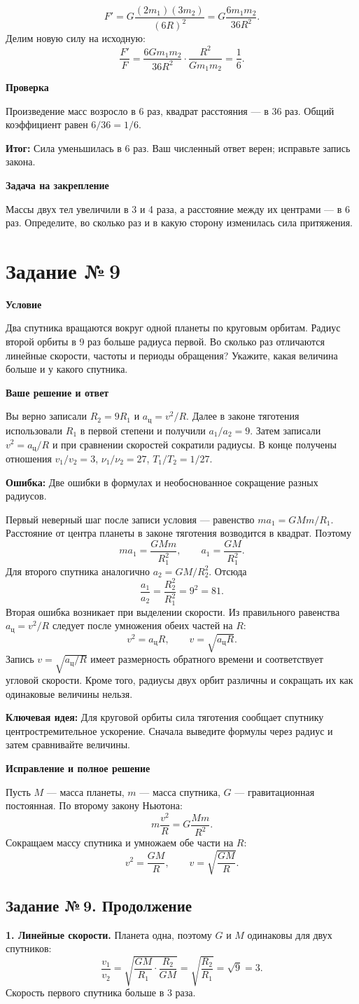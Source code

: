 \documentclass[a4paper,12pt]{article}
\newcommand{\topic}[1]{\par\medskip\textbf{\textcolor{darkaccent}{#1}}\par}
\newcommand{\error}[1]{\par\medskip\textbf{\textcolor{err}{Ошибка:}} #1\par}
\newcommand{\key}[1]{\par\medskip\textbf{\textcolor{blue!60!black}{Ключевая идея:}} #1\par}
\newcommand{\result}[1]{\par\medskip\textbf{\textcolor{accent}{Итог:}} #1\par}
\newcommand{\task}[1]{\clearpage\phantomsection\label{task:#1}\section*{Задание №\,#1}}
\begin{document}
\[ F'=G\frac{(2m_1)(3m_2)}{(6R)^2}=G\frac{6m_1m_2}{36R^2}. \]
Делим новую силу на исходную:
\[ \frac{F'}{F}=\frac{6Gm_1m_2}{36R^2}\cdot\frac{R^2}{Gm_1m_2}=\frac16. \]
\topic{Проверка}
Произведение масс возросло в 6 раз, квадрат расстояния --- в 36 раз. Общий коэффициент равен $6/36=1/6$.
\result{Сила уменьшилась в 6 раз. Ваш численный ответ верен; исправьте запись закона.}
\topic{Задача на закрепление}
Массы двух тел увеличили в 3 и 4 раза, а расстояние между их центрами --- в 6 раз. Определите, во сколько раз и в какую сторону изменилась сила притяжения.
\task{9}
\topic{Условие}
Два спутника вращаются вокруг одной планеты по круговым орбитам. Радиус второй орбиты в 9 раз больше радиуса первой. Во сколько раз отличаются линейные скорости, частоты и периоды обращения? Укажите, какая величина больше и у какого спутника.
\topic{Ваше решение и ответ}
Вы верно записали $R_2=9R_1$ и $a_{\text{ц}}=v^2/R$. Далее в законе тяготения использовали $R_1$ в первой степени и получили $a_1/a_2=9$. Затем записали $v^2=a_{\text{ц}}/R$ и при сравнении скоростей сократили радиусы. В конце получены отношения $v_1/v_2=3$, $\nu_1/\nu_2=27$, $T_1/T_2=1/27$.
\error{Две ошибки в формулах и необоснованное сокращение разных радиусов.}
Первый неверный шаг после записи условия --- равенство $ma_1=GMm/R_1$. Расстояние от центра планеты в законе тяготения возводится в квадрат. Поэтому
\[ ma_1=\frac{GMm}{R_1^2},\qquad a_1=\frac{GM}{R_1^2}. \]
Для второго спутника аналогично $a_2=GM/R_2^2$. Отсюда
\[ \frac{a_1}{a_2}=\frac{R_2^2}{R_1^2}=9^2=81. \]
Вторая ошибка возникает при выделении скорости. Из правильного равенства $a_{\text{ц}}=v^2/R$ следует после умножения обеих частей на $R$:
\[ v^2=a_{\text{ц}}R,\qquad v=\sqrt{a_{\text{ц}}R}. \]
Запись $v=\sqrt{a_{\text{ц}}/R}$ имеет размерность обратного времени и соответствует угловой скорости. Кроме того, радиусы двух орбит различны и сокращать их как одинаковые величины нельзя.
\key{Для круговой орбиты сила тяготения сообщает спутнику центростремительное ускорение. Сначала выведите формулы через радиус и затем сравнивайте величины.}
\topic{Исправление и полное решение}
Пусть $M$ --- масса планеты, $m$ --- масса спутника, $G$ --- гравитационная постоянная. По второму закону Ньютона:
\[ m\frac{v^2}{R}=G\frac{Mm}{R^2}. \]
Сокращаем массу спутника и умножаем обе части на $R$:
\[ v^2=\frac{GM}{R},\qquad v=\sqrt{\frac{GM}{R}}. \]
\clearpage
\subsection*{Задание №\,9. Продолжение}
\textbf{1. Линейные скорости.} Планета одна, поэтому $G$ и $M$ одинаковы для двух спутников:
\[ \frac{v_1}{v_2}=\sqrt{\frac{GM}{R_1}\cdot\frac{R_2}{GM}}=\sqrt{\frac{R_2}{R_1}}=\sqrt9=3. \]
Скорость первого спутника больше в 3 раза.
\end{document}
